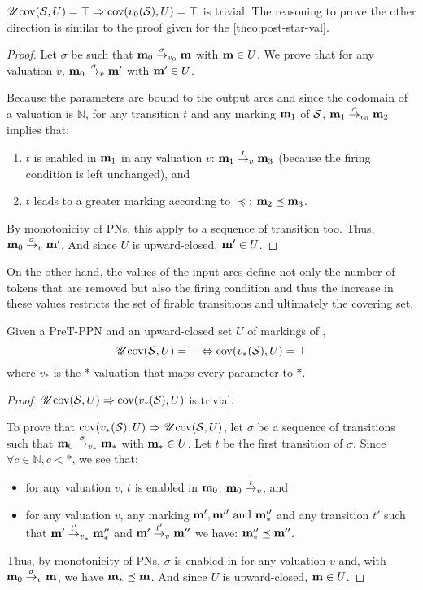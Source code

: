 \(\operatorname{\mathscr{U}cov}(\mathcal{S}, U) = \top \Rightarrow \operatorname{cov}(v_0(\mathcal{S}), U) = \top\) is trivial.
The reasoning to prove the other direction is similar to the proof given for the \autoref{theo:post-star-val}.

\begin{proof}
  Let $\sigma$ be such that $\mathbf{m}_0 \stackrel{\sigma}{\to}_{v_0} \mathbf{m}$ with $\mathbf{m} \in U$.
  We prove that for any valuation $v$, $\mathbf{m}_0 \stackrel{\sigma}{\to}_v \mathbf{m'}$ with $\mathbf{m'} \in U$.

  Because the parameters are bound to the output arcs and since the codomain of a valuation is $\mathbb{N}$, for any transition $t$ and any marking $\mathbf{m}_1$ of $\mathcal{S}$, $\mathbf{m}_1 \stackrel{\sigma}{\to}_{v_0} \mathbf{m}_2$ implies that:
  \begin{enumerate}
    \item $t$ is enabled in $\mathbf{m}_1$ in any valuation $v$: $\mathbf{m}_1 \stackrel{t}{\to}_v \mathbf{m}_3$ (because the firing condition is left unchanged), and
    \item $t$ leads to a greater marking according to $\preceq$: $\mathbf{m}_2 \preceq \mathbf{m}_3$.
  \end{enumerate}

  By monotonicity of \acp{PN}, this apply to a sequence of transition too.
  Thus, $\mathbf{m}_0 \stackrel{\sigma}{\to}_v \mathbf{m'}$.
  And since $U$ is upward-closed, $\mathbf{m'} \in U$.
\end{proof}

On the other hand, the values of the input arcs define not only the number of tokens that are removed but also the firing condition and thus the increase in these values restricts the set of firable transitions and ultimately the covering set.

\begin{theo}
  \label{theo:pre-u-star-val}
  Given a PreT-\ac{PPN} \SPTPm and an upward-closed set $U$ of markings of \PPN, \[\operatorname{\mathscr{U}cov}(\mathcal{S}, U) = \top \Leftrightarrow \operatorname{cov}(v_*(\mathcal{S}), U) = \top\] where $v_*$ is the *-valuation that maps every parameter to $*$.
\end{theo}

\begin{proof}
  $\operatorname{\mathscr{U}cov}(\mathcal{S}, U) \Rightarrow \operatorname{cov}(v_*(\mathcal{S}), U)$ is trivial.

  To prove that $\operatorname{cov}(v_*(\mathcal{S}), U) \Rightarrow \operatorname{\mathscr{U}cov}(\mathcal{S}, U)$, let $\sigma$ be a sequence of transitions such that $\mathbf{m}_0 \stackrel{\sigma}{\to}_{v_*} \mathbf{m}_*$ with $\mathbf{m}_* \in U$.
  Let $t$ be the first transition of $\sigma$.
  Since $\forall c \in \mathbb{N}, c < *$, we see that:
  \begin{itemize}
    \item for any valuation $v$, $t$ is enabled in $\mathbf{m}_0$: $\mathbf{m}_0 \stackrel{t}{\to}_{v}$, and
    \item for any valuation $v$, any marking $\mathbf{m}', \mathbf{m}'' \text{ and } \mathbf{m}''_*$ and any transition $t'$ such that $\mathbf{m}' \stackrel{t'}{\to}_{v_*} \mathbf{m}''_*$ and $\mathbf{m}' \stackrel{t'}{\to}_v \mathbf{m}''$ we have: $\mathbf{m}''_* \preceq \mathbf{m}''$.
  \end{itemize}

  Thus, by monotonicity of \acp{PN}, $\sigma$ is enabled in \mari for any valuation $v$ and, with $\mathbf{m}_0 \stackrel{\sigma}{\to}_v \mathbf{m}$, we have $\mathbf{m}_* \preceq \mathbf{m}$.
  And since $U$ is upward-closed, $\mathbf{m} \in U$.
\end{proof}

